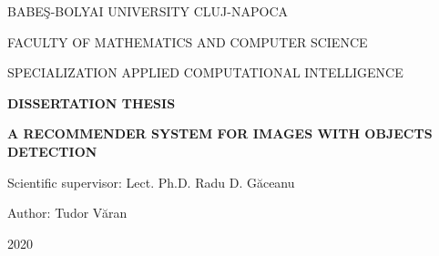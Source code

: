 \documentclass[a4paper, 12pt, english]{report}
\begin{document}
\begin{titlepage}
\sloppy
\begin{center}
\Large{BABE\c{S}-BOLYAI UNIVERSITY CLUJ-NAPOCA}

\Large{FACULTY OF MATHEMATICS AND COMPUTER SCIENCE}

\Large{SPECIALIZATION APPLIED COMPUTATIONAL INTELLIGENCE}

 

\vspace{7cm}
\Large \textbf{DISSERTATION THESIS}

\vspace{1.3cm}
\Huge \textbf{A RECOMMENDER SYSTEM FOR IMAGES WITH OBJECTS DETECTION}

\end{center}
\vspace{4cm}

\begin{flushleft}
	\Large{Scientific supervisor: Lect. Ph.D. Radu D. G\u{a}ceanu}
\end{flushleft}

\vspace{1cm}

\begin{flushright}
	\Large{Author: Tudor V\u{a}ran}
\end{flushright}

\vspace{1cm}

\begin{center}
\Large{2020}
\end{center}

\end{titlepage}
\end{document}

